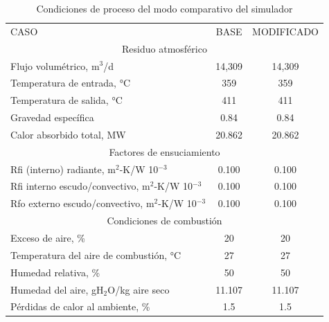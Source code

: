 \begin{table}[H]
\caption{Condiciones de proceso del modo comparativo del simulador}
\label{tbl:comparison-cp}
\centering
\begin{tabular}{l|c|c}
CASO    & BASE & MODIFICADO \\

\multicolumn{3}{c}{Residuo atmosférico} \\
Flujo volumétrico,  m$^3$/d      &14,309 &14,309 \\
Temperatura de entrada,  °C   &359    &359    \\
Temperatura de salida,  °C    &411    &411    \\
Gravedad específica           &0.84   &0.84   \\
Calor absorbido total,  MW    &20.862 &20.862 \\
\multicolumn{3}{c}{Factores de ensuciamiento} \\
Rfi (interno) radiante,  m$^2$-K/W 10$^{-3}$        &0.100  &0.100 \\
Rfi interno escudo/convectivo,  m$^2$-K/W 10$^{-3}$ &0.100  &0.100 \\
Rfo externo escudo/convectivo,  m$^2$-K/W 10$^{-3}$ &0.100  &0.100 \\

\multicolumn{3}{c}{Condiciones de combustión} \\
Exceso de aire, \%                      &20     &20   \\
Temperatura del aire de combustión, °C  &27     &27   \\
Humedad relativa, \%                    &50     &50   \\
Humedad del aire,  gH$_2$O/kg aire seco &11.107 &11.107 \\
Pérdidas de calor al ambiente, \%  &1.5    &1.5  \\


\end{tabular}
\end{table}
